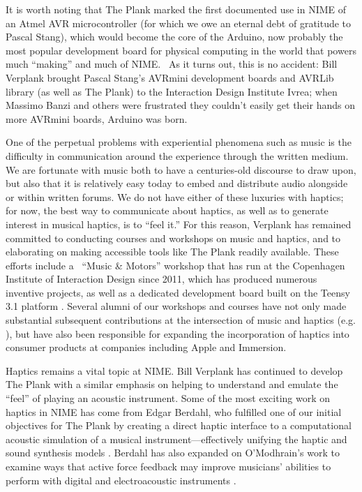 It is worth noting that The Plank marked the first documented use in NIME of an Atmel AVR microcontroller (for which we owe an eternal debt of gratitude to Pascal Stang), which would become the core of the Arduino, now probably the most popular development board for physical computing in the world that powers much ``making'' and much of NIME.  As it turns out, this is no accident: Bill Verplank brought Pascal Stang's AVRmini development boards and AVRLib library (as well as The Plank) to the Interaction Design Institute Ivrea; when Massimo Banzi and others were frustrated they couldn't easily get their hands on more AVRmini boards, Arduino was born. 

One of the perpetual problems with experiential phenomena such as music is the difficulty in communication around the experience through the written medium. We are fortunate with music both to have a centuries-old discourse to draw upon, but also that it is relatively easy today to embed and distribute audio alongside or within written forums. We do not have either of these luxuries with haptics; for now, the best way to communicate about haptics, as well as to generate interest in musical haptics, is to ``feel it.'' For this reason, Verplank has remained committed to conducting courses and workshops on music and haptics, and to elaborating on making accessible tools like The Plank readily available. These efforts include a  ``Music \& Motors'' workshop that has run at the Copenhagen Institute of Interaction Design since 2011, which has produced numerous inventive projects, as well as a dedicated development board built on the Teensy 3.1 platform \cite{Bak:2015}. Several alumni of our workshops and courses have not only made substantial subsequent contributions at the intersection of music and haptics (e.g. \cite{Gillespie:1995}), but have also been responsible for expanding the incorporation of haptics into consumer products at companies including Apple and Immersion. 

Haptics remains a vital topic at NIME. Bill Verplank has continued to develop The Plank with a similar emphasis on helping to understand and emulate the ``feel'' of playing an acoustic instrument. Some of the most exciting work on haptics in NIME has come from Edgar Berdahl, who fulfilled one of our initial objectives for The Plank by creating a direct haptic interface to a computational acoustic simulation of a musical instrument---effectively unifying the haptic and sound synthesis models \cite{Berdahl:2009}. Berdahl has also expanded on O'Modhrain's work to examine ways that active force feedback may improve musicians' abilities to perform with digital and electroacoustic instruments \cite{Berdahl:2009a}. 


